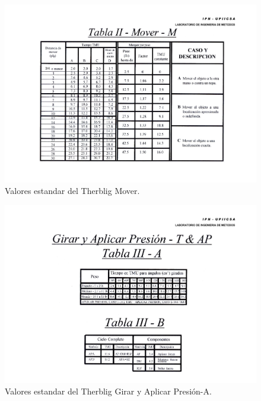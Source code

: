 \begin{figure}[H]
    \centering
    \includegraphics[scale=0.35]{15/img/tabla2Mover.pdf}
    \caption{Valores estandar del Therblig Mover.}
    \label{fig:tabla2Mover}
\end{figure}

\begin{figure}[H]
    \centering
    \includegraphics[scale=0.4]{15/img/tabla3GirarAplicarPresion-A.pdf}
    \caption{Valores estandar del Therblig Girar y Aplicar Presión-A.}
    \label{fig:tabla3GirarAplicarPresion-A}
\end{figure}

